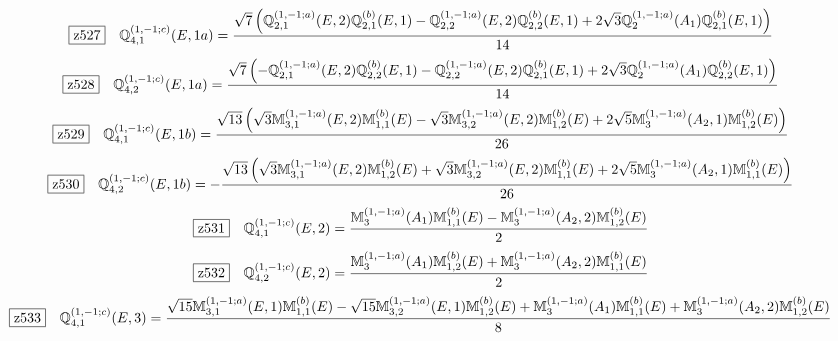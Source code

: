 \documentclass[fleqn,10pt,landscape]{jsarticle}
\begin{document}
\begin{dmath*}
\hspace*{3mm}\fbox{z527}\quad \mathbb{Q}_{4,1}^{(1,-1;c)}(E,1a)=\frac{\sqrt{7} \left(\mathbb{Q}_{2,1}^{(1,-1;a)}(E,2) \mathbb{Q}_{2,1}^{(b)}(E,1) - \mathbb{Q}_{2,2}^{(1,-1;a)}(E,2) \mathbb{Q}_{2,2}^{(b)}(E,1) + 2 \sqrt{3} \mathbb{Q}_{2}^{(1,-1;a)}(A_{1}) \mathbb{Q}_{2,1}^{(b)}(E,1)\right)}{14}
\end{dmath*}
\begin{dmath*}
\hspace*{3mm}\fbox{z528}\quad \mathbb{Q}_{4,2}^{(1,-1;c)}(E,1a)=\frac{\sqrt{7} \left(- \mathbb{Q}_{2,1}^{(1,-1;a)}(E,2) \mathbb{Q}_{2,2}^{(b)}(E,1) - \mathbb{Q}_{2,2}^{(1,-1;a)}(E,2) \mathbb{Q}_{2,1}^{(b)}(E,1) + 2 \sqrt{3} \mathbb{Q}_{2}^{(1,-1;a)}(A_{1}) \mathbb{Q}_{2,2}^{(b)}(E,1)\right)}{14}
\end{dmath*}
\begin{dmath*}
\hspace*{3mm}\fbox{z529}\quad \mathbb{Q}_{4,1}^{(1,-1;c)}(E,1b)=\frac{\sqrt{13} \left(\sqrt{3} \mathbb{M}_{3,1}^{(1,-1;a)}(E,2) \mathbb{M}_{1,1}^{(b)}(E) - \sqrt{3} \mathbb{M}_{3,2}^{(1,-1;a)}(E,2) \mathbb{M}_{1,2}^{(b)}(E) + 2 \sqrt{5} \mathbb{M}_{3}^{(1,-1;a)}(A_{2},1) \mathbb{M}_{1,2}^{(b)}(E)\right)}{26}
\end{dmath*}
\begin{dmath*}
\hspace*{3mm}\fbox{z530}\quad \mathbb{Q}_{4,2}^{(1,-1;c)}(E,1b)=- \frac{\sqrt{13} \left(\sqrt{3} \mathbb{M}_{3,1}^{(1,-1;a)}(E,2) \mathbb{M}_{1,2}^{(b)}(E) + \sqrt{3} \mathbb{M}_{3,2}^{(1,-1;a)}(E,2) \mathbb{M}_{1,1}^{(b)}(E) + 2 \sqrt{5} \mathbb{M}_{3}^{(1,-1;a)}(A_{2},1) \mathbb{M}_{1,1}^{(b)}(E)\right)}{26}
\end{dmath*}
\begin{dmath*}
\hspace*{3mm}\fbox{z531}\quad \mathbb{Q}_{4,1}^{(1,-1;c)}(E,2)=\frac{\mathbb{M}_{3}^{(1,-1;a)}(A_{1}) \mathbb{M}_{1,1}^{(b)}(E) - \mathbb{M}_{3}^{(1,-1;a)}(A_{2},2) \mathbb{M}_{1,2}^{(b)}(E)}{2}
\end{dmath*}
\begin{dmath*}
\hspace*{3mm}\fbox{z532}\quad \mathbb{Q}_{4,2}^{(1,-1;c)}(E,2)=\frac{\mathbb{M}_{3}^{(1,-1;a)}(A_{1}) \mathbb{M}_{1,2}^{(b)}(E) + \mathbb{M}_{3}^{(1,-1;a)}(A_{2},2) \mathbb{M}_{1,1}^{(b)}(E)}{2}
\end{dmath*}
\begin{dmath*}
\hspace*{3mm}\fbox{z533}\quad \mathbb{Q}_{4,1}^{(1,-1;c)}(E,3)=\frac{\sqrt{15} \mathbb{M}_{3,1}^{(1,-1;a)}(E,1) \mathbb{M}_{1,1}^{(b)}(E) - \sqrt{15} \mathbb{M}_{3,2}^{(1,-1;a)}(E,1) \mathbb{M}_{1,2}^{(b)}(E) + \mathbb{M}_{3}^{(1,-1;a)}(A_{1}) \mathbb{M}_{1,1}^{(b)}(E) + \mathbb{M}_{3}^{(1,-1;a)}(A_{2},2) \mathbb{M}_{1,2}^{(b)}(E)}{8}
\end{dmath*}
\end{document}

